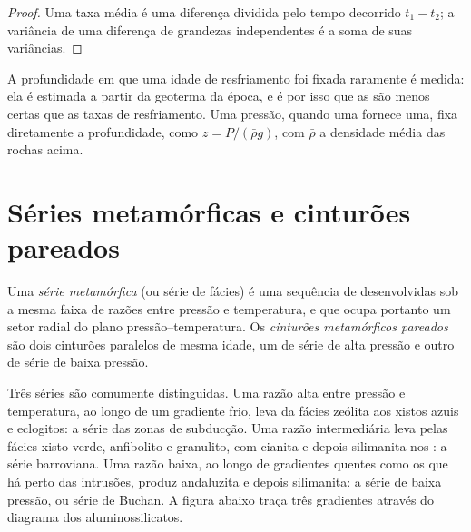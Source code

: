 \begin{proof}
Uma taxa média é uma diferença dividida pelo tempo decorrido $t_1 - t_2$; a variância de uma
diferença de grandezas independentes é a soma de suas variâncias.
\end{proof}

A profundidade em que uma idade de resfriamento foi fixada raramente é medida: ela é estimada a partir da
geoterma da época, e é por isso que as  são menos certas que as taxas de resfriamento.
Uma pressão, quando uma  fornece uma, fixa diretamente a profundidade, como
$z = P/(\bar\rho g)$, com $\bar\rho$ a densidade média das rochas acima.

\section{Séries metamórficas e cinturões pareados}\label{sec:b2:pt-paths:series}

\begin{definition}\label{def:b2:pt-paths:series}
Uma \emph{série metamórfica} (ou série de fácies) é uma sequência de
 desenvolvidas sob a mesma faixa de razões entre pressão e temperatura,
e que ocupa portanto um setor radial do plano pressão--temperatura.
Os \emph{cinturões metamórficos pareados} são dois cinturões paralelos de
mesma idade, um de série de alta pressão e outro de série de baixa pressão.
\end{definition}

Três séries são comumente distinguidas. Uma razão alta entre pressão e temperatura, ao longo de um
gradiente frio, leva da fácies zeólita aos xistos azuis e eclogitos: a série
das zonas de subducção. Uma razão intermediária leva pelas fácies xisto verde, anfibolito e
granulito, com cianita e depois silimanita nos : a série barroviana. Uma razão
baixa, ao longo de gradientes quentes como os que há perto das intrusões, produz andaluzita e depois
silimanita: a série de baixa pressão, ou série de Buchan. A figura abaixo traça três gradientes
através do diagrama dos aluminossilicatos.

